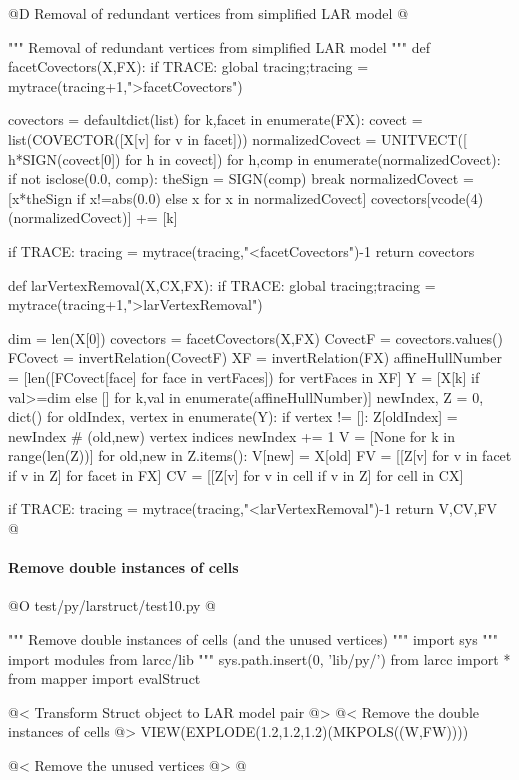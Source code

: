 \documentclass[11pt,oneside]{article}	%
\begin{document}
@D Removal of redundant vertices from simplified LAR model
@{""" Removal of redundant vertices from simplified LAR model """
def facetCovectors(X,FX):
	if TRACE: global tracing;tracing = mytrace(tracing+1,">facetCovectors")

	covectors = defaultdict(list) 
	for k,facet in enumerate(FX):
		covect = list(COVECTOR([X[v] for v in facet]))
		normalizedCovect = UNITVECT([ h*SIGN(covect[0])  for h in covect])
		for h,comp in enumerate(normalizedCovect): 
			if not isclose(0.0, comp): 
				theSign = SIGN(comp)
				break
		normalizedCovect = [x*theSign  if x!=abs(0.0) else x for x in normalizedCovect]
		covectors[vcode(4)(normalizedCovect)] += [k]

	if TRACE: tracing = mytrace(tracing,"<facetCovectors")-1
	return covectors

def larVertexRemoval(X,CX,FX):
	if TRACE: global tracing;tracing = mytrace(tracing+1,">larVertexRemoval")

	dim = len(X[0])
	covectors = facetCovectors(X,FX)
	CovectF = covectors.values()
	FCovect = invertRelation(CovectF)
	XF = invertRelation(FX)
	affineHullNumber = [len([FCovect[face] for face in vertFaces]) for vertFaces in XF]
	Y = [X[k] if val>=dim else [] for k,val in enumerate(affineHullNumber)]
	newIndex, Z = 0, dict()
	for oldIndex, vertex in enumerate(Y):
		if vertex != []:
			Z[oldIndex] = newIndex  # (old,new) vertex indices
			newIndex += 1
	V = [None for k in range(len(Z))]
	for old,new in Z.items():
		V[new] = X[old]
	FV = [[Z[v] for v in facet if v in Z] for facet in FX]
	CV = [[Z[v] for v in cell if v in Z] for cell in CX]

	if TRACE: tracing = mytrace(tracing,"<larVertexRemoval")-1
	return V,CV,FV
@}


\paragraph{Remove double instances of cells}

@O test/py/larstruct/test10.py
@{""" Remove double instances of cells (and the unused vertices) """
import sys
""" import modules from larcc/lib """
sys.path.insert(0, 'lib/py/')
from larcc import *
from mapper import evalStruct

@< Transform Struct object to LAR model pair @>
@< Remove the double instances of cells @>
VIEW(EXPLODE(1.2,1.2,1.2)(MKPOLS((W,FW))))

@< Remove the unused vertices @>
@}
\end{document}
